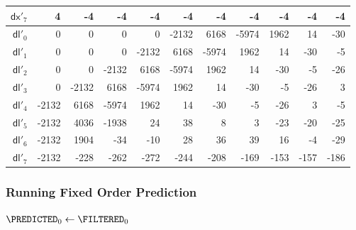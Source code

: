 \begin{table}[h]
{\begin{tabular}{r|rrrrrrrrrr}
      $\textsf{dx}'_{7}$ & 4 & -4 & -4 & -4 & -4 & -4 & -4 & -4 & -4 & -4 \\
      \hline
      $\textsf{dl}'_{0}$ & 0 & 0 & 0 & 0 & -2132 & 6168 & -5974 & 1962 & 14 & -30 \\
      $\textsf{dl}'_{1}$ & 0 & 0 & 0 & -2132 & 6168 & -5974 & 1962 & 14 & -30 & -5 \\
      $\textsf{dl}'_{2}$ & 0 & 0 & -2132 & 6168 & -5974 & 1962 & 14 & -30 & -5 & -26 \\
      $\textsf{dl}'_{3}$ & 0 & -2132 & 6168 & -5974 & 1962 & 14 & -30 & -5 & -26 & 3 \\
      $\textsf{dl}'_{4}$ & -2132 & 6168 & -5974 & 1962 & 14 & -30 & -5 & -26 & 3 & -5 \\
      $\textsf{dl}'_{5}$ & -2132 & 4036 & -1938 & 24 & 38 & 8 & 3 & -23 & -20 & -25 \\
      $\textsf{dl}'_{6}$ & -2132 & 1904 & -34 & -10 & 28 & 36 & 39 & 16 & -4 & -29 \\
      $\textsf{dl}'_{7}$ & -2132 & -228 & -262 & -272 & -244 & -208 & -169 & -153 & -157 & -186 \\
    \end{tabular}
  }
\end{table}

\clearpage

\subsubsection{Running Fixed Order Prediction}
\label{tta:fixedprediction}
{
  \BlankLine
  $\text{\PREDICTED}_0 \leftarrow \text{\FILTERED}_0$\;
  \Return \PREDICTED\;
  \EALGORITHM
}

